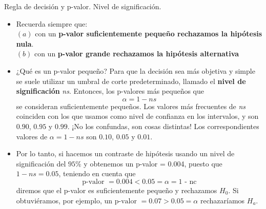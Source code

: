 \documentclass[
  9pt,
  ignorenonframetext,
]{beamer}
\begin{document}
\begin{frame}{Regla de decisión y p-valor. Nivel de significación.}
\protect\hypertarget{regla-de-decision-y-p-valor.-nivel-de-significacion.}{}

\begin{itemize}
\item
  Recuerda siempre que:\\
  \((a)\) con un \textbf{p-valor suficientemente pequeño rechazamos la
  hipótesis nula}.\\
  \((b)\) con un \textbf{p-valor grande rechazamos la hipótesis
  alternativa}
\item
  ¿Qué es un p-valor pequeño? Para que la decisión sea más objetiva y
  simple se suele utilizar un umbral de corte predeterminado, llamado el
  \textbf{nivel de significación} \emph{ns}. Entonces, los p-valores más
  pequeños que \[\alpha = 1 - ns\] se consideran suficientemente
  pequeños. Los valores más frecuentes de \emph{ns} coinciden con los
  que usamos como nivel de confianza en los intervalos, y son \(0.90\),
  \(0.95\) y \(0.99\). ¡No los confundas, son cosas distintas! Los
  correspondientes valores de \(\alpha = 1 - ns\) son \(0.10\), \(0.05\)
  y \(0.01\).
\item
  Por lo tanto, si hacemos un contraste de hipótesis usando un nivel de
  significación del \(95\%\) y obtenemos un p-valor = 0.004, puesto que
  \(1 - ns = 0.05\), teniendo en cuenta que
  \[\text{p-valor }= 0.004 < 0.05 = \alpha = \text{1 - nc}\] diremos que
  el p-valor es suficientemente pequeño y rechazamos \(H_0\). Si
  obtuviéramos, por ejemplo, un
  \(\text{p-valor }= 0.07 > 0.05 = \alpha\) rechazaríamos \(H_a\).
\end{itemize}

\end{frame}
\end{document}
